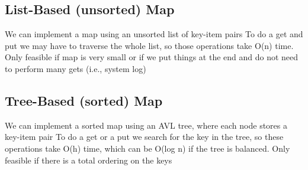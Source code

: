 \documentclass[12pt]{article}
\newcommand{\1}{\space \quad}
\newcommand{\2}{\quad \quad \quad}
\newcommand{\3}{\quad \quad \quad \quad \space}
\newcommand{\4}{\quad \quad \quad \quad \quad \quad}
\begin{document}
\subsection{List-Based (unsorted) Map}
We can implement a map using an unsorted list of key-item pairs
To do a get and put we may have to traverse the whole list, so
those operations take O(n) time.
Only feasible if map is very small or if we put things at the end
and do not need to perform many gets (i.e., system log) 

\subsection{Tree-Based (sorted) Map}
We can implement a sorted map using an AVL tree, where each
node stores a key-item pair
To do a get or a put we search for the key in the tree, so these
operations take O(h) time, which can be O(log n) if the tree is
balanced.
Only feasible if there is a total ordering on the keys
\end{document}

